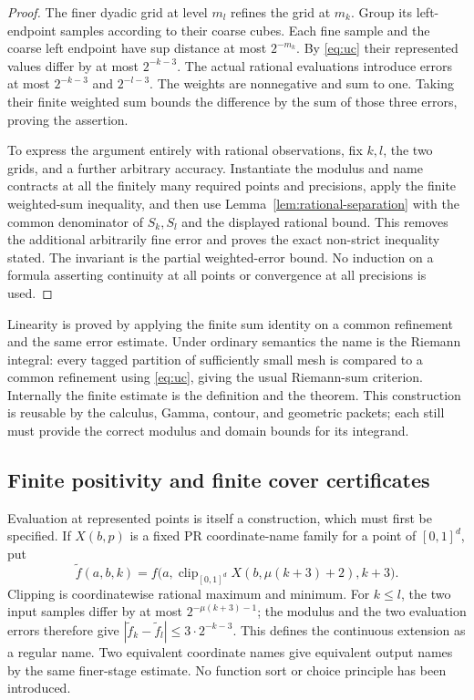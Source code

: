 \begin{proof}
The finer dyadic grid at level \(m_l\) refines the grid at \(m_k\).
Group its left-endpoint samples according to their coarse cubes.  Each
fine sample and the coarse left endpoint have sup distance at most
\(2^{-m_k}\).  By \eqref{eq:uc} their represented values differ by at
most \(2^{-k-3}\).  The actual rational evaluations introduce errors at
most \(2^{-k-3}\) and \(2^{-l-3}\).  The weights are nonnegative and
sum to one.  Taking their finite weighted sum bounds the difference by
the sum of those three errors, proving the assertion.

To express the argument entirely with rational observations, fix \(k,l\),
the two grids, and a further arbitrary accuracy.  Instantiate the modulus
and name contracts at all the finitely many required points and
precisions, apply the finite weighted-sum inequality, and then use
Lemma~\ref{lem:rational-separation} with the common denominator of
\(S_k,S_l\) and the displayed rational bound.  This removes the
additional arbitrarily fine error and proves the exact non-strict
inequality stated.  The invariant is the
partial weighted-error bound.  No induction on a formula asserting
continuity at all points or convergence at all precisions is used.
\end{proof}

Linearity is proved by applying the finite sum identity on a common
refinement and the same error estimate.  Under ordinary semantics the
name is the Riemann integral: every tagged partition of sufficiently small
mesh is compared to a common refinement using \eqref{eq:uc}, giving the
usual Riemann-sum criterion.  Internally the finite estimate is the
definition and the theorem.  This construction is reusable by the
calculus, Gamma, contour, and geometric packets; each still must provide
the correct modulus and domain bounds for its integrand.

\subsection{Finite positivity and finite cover certificates}

Evaluation at represented points is itself a construction, which must
first be specified.  If \(X(b,p)\) is a fixed PR coordinate-name family
for a point of \([0,1]^d\), put
\[
 \widetilde f(a,b,k)=
 f\bigl(a,\operatorname{clip}_{[0,1]^d}
       X(b,\mu(k+3)+2),k+3\bigr).
\]
Clipping is coordinatewise rational maximum and minimum.  For \(k\le l\),
the two input samples differ by at most
\(2^{-\mu(k+3)-1}\); the modulus and the two evaluation errors
therefore give
\(|\widetilde f_k-\widetilde f_l|\le3\cdot2^{-k-3}\).
This defines the continuous extension as a regular name.  Two equivalent
coordinate names give equivalent output names by the same finer-stage
estimate.  No function sort or choice principle has been introduced.

